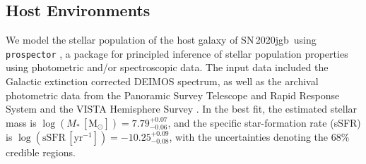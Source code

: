 \documentclass[twocolumn]{aastex631}
\newcommand{\sn}{SN\,2020jgb}
\begin{document}
\subsection{Host Environments} \label{sec:host}
We model the stellar population of the host galaxy of \sn\ using \texttt{prospector} \citep{Johnson_prospector_2021}, a package for principled inference of stellar population properties using photometric and/or spectroscopic data. The input data included the Galactic extinction corrected DEIMOS spectrum, as well as the archival photometric data from the Panoramic Survey Telescope and Rapid Response System \citep[Pan-STARRS;][{\it r, i, z} Kron magnitudes]{PS1_2016}  and the VISTA Hemisphere Survey \citep[VHS;][J and $\mathrm{K}_\mathrm{s}$ Petrosian magnitudes]{VHS_2013}. In the best fit, the estimated stellar mass is $\log (M_*\,[\mathrm{M_\odot}])=7.79_{-0.06}^{+0.07}$, and the specific star-formation rate (sSFR) is $\log (\mathrm{sSFR}\,[\mathrm{yr}^{-1}])=-10.25_{-0.08}^{+0.09}$, with the uncertainties denoting the 68\% credible regions.
\end{document}

